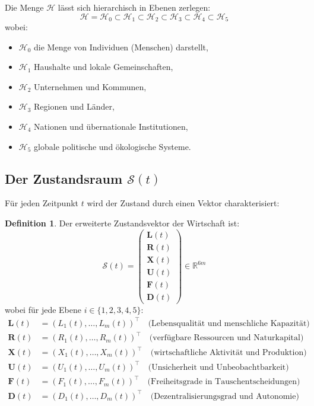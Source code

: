 \documentclass[a4paper, 12pt, twoside, openright]{report}
\theoremstyle{definition}
\newtheorem{definition}[theorem]{Definition}
\theoremstyle{definition}
\begin{document}
Die Menge $\mathcal{H}$ lässt sich hierarchisch in Ebenen zerlegen:
\begin{equation}
\mathcal{H} = \mathcal{H}_0 \subset \mathcal{H}_1 \subset \mathcal{H}_2 \subset \mathcal{H}_3 \subset \mathcal{H}_4 \subset \mathcal{H}_5
\end{equation}
wobei:
\begin{itemize}
\item $\mathcal{H}_0$ die Menge von Individuen (Menschen) darstellt,
\item $\mathcal{H}_1$ Haushalte und lokale Gemeinschaften,
\item $\mathcal{H}_2$ Unternehmen und Kommunen,
\item $\mathcal{H}_3$ Regionen und Länder,
\item $\mathcal{H}_4$ Nationen und übernationale Institutionen,
\item $\mathcal{H}_5$ globale politische und ökologische Systeme.
\end{itemize}

\subsection{Der Zustandsraum $\mathcal{S}(t)$}

Für jeden Zeitpunkt $t$ wird der Zustand durch einen Vektor charakterisiert:

\begin{definition}
\label{def:zustandsvektor}
Der erweiterte Zustandsvektor der Wirtschaft ist:
\begin{equation}
\mathcal{S}(t) = \left(
\begin{array}{c}
\mathbf{L}(t) \\
\mathbf{R}(t) \\
\mathbf{X}(t) \\
\mathbf{U}(t) \\
\mathbf{F}(t) \\
\mathbf{D}(t)
\end{array}
\right) \in \mathbb{R}^{6m}
\end{equation}
wobei für jede Ebene $i \in \{1, 2, 3, 4, 5\}$:
\begin{align}
\mathbf{L}(t) &= (L_1(t), \ldots, L_m(t))^{\top} \quad \text{(Lebensqualität und menschliche Kapazität)} \\
\mathbf{R}(t) &= (R_1(t), \ldots, R_m(t))^{\top} \quad \text{(verfügbare Ressourcen und Naturkapital)} \\
\mathbf{X}(t) &= (X_1(t), \ldots, X_m(t))^{\top} \quad \text{(wirtschaftliche Aktivität und Produktion)} \\
\mathbf{U}(t) &= (U_1(t), \ldots, U_m(t))^{\top} \quad \text{(Unsicherheit und Unbeobachtbarkeit)} \\
\mathbf{F}(t) &= (F_1(t), \ldots, F_m(t))^{\top} \quad \text{(Freiheitsgrade in Tauschentscheidungen)} \\
\mathbf{D}(t) &= (D_1(t), \ldots, D_m(t))^{\top} \quad \text{(Dezentralisierungsgrad und Autonomie)}
\end{align}
\end{definition}
\end{document}

